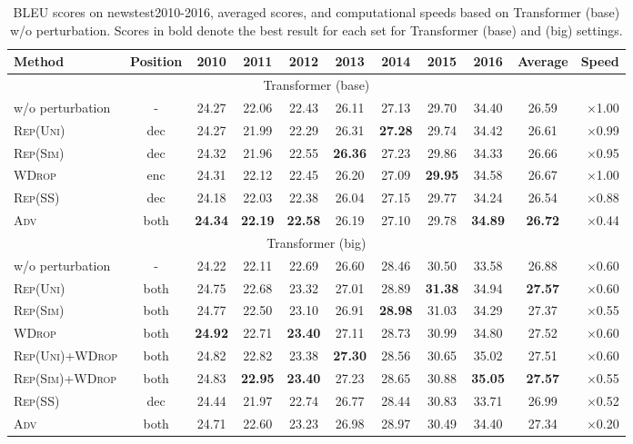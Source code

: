 \documentclass[11pt]{article}
\newcommand{\uniform}{\textsc{Rep(Uni)}}
\newcommand{\parass}{\textsc{Rep(SS)}}
\newcommand{\similarity}{\textsc{Rep(Sim)}}
\newcommand{\worddrop}{\textsc{WDrop}}
\newcommand{\adv}{\textsc{Adv}}
\begin{document}
\begin{table*}[!t]
  \centering{}
  \footnotesize
  \begin{tabular}{ l | c | c c c c c c c | c | r } \hline
  Method & Position & 2010 & 2011 & 2012 & 2013 & 2014 & 2015 & 2016 & Average & Speed \\ \hline \hline
  \multicolumn{11}{c}{Transformer (base)} \\ \hline \hline
  w/o perturbation & - & 24.27 & 22.06 & 22.43 & 26.11 & 27.13 & 29.70 & 34.40 & 26.59 & $\times$1.00 \\ \hline
  \uniform{} & dec & 24.27 & 21.99 & 22.29 & 26.31 & \textbf{27.28} & 29.74 & 34.42 & 26.61 & $\times$0.99 \\
  \similarity{} & dec & 24.32 & 21.96 & 22.55 & \textbf{26.36} & 27.23 & 29.86 & 34.33 & 26.66 & $\times$0.95 \\
  \worddrop{} & enc & 24.31 & 22.12 & 22.45 & 26.20 & 27.09 & \textbf{29.95} & 34.58 & 26.67 & $\times$1.00 \\
  \parass{} & dec & 24.18 & 22.03 & 22.38 & 26.04 & 27.15 & 29.77 & 34.24 & 26.54 & $\times$0.88 \\
  \adv{} & both & \textbf{24.34} & \textbf{22.19} & \textbf{22.58} & 26.19 & 27.10 & 29.78 & \textbf{34.89} & \textbf{26.72}& $\times$0.44 \\ \hline \hline
  \multicolumn{11}{c}{Transformer (big)} \\ \hline \hline 
  w/o perturbation & - & 24.22 & 22.11 & 22.69 & 26.60 & 28.46 & 30.50 & 33.58 & 26.88 & $\times$0.60 \\ \hline
  \uniform{} & both & 24.75 & 22.68 & 23.32 & 27.01 & 28.89 & \textbf{31.38} & 34.94 & \textbf{27.57} & $\times$0.60 \\
  \similarity{} & both & 24.77 & 22.50 & 23.10 & 26.91 & \textbf{28.98} & 31.03 & 34.29 & 27.37 & $\times$0.55 \\
  \worddrop{} & both & \textbf{24.92} & 22.71 & \textbf{23.40} & 27.11 & 28.73 & 30.99 & 34.80 & 27.52 & $\times$0.60 \\
  \uniform{}+\worddrop{} & both & 24.82 & 22.82 & 23.38 & \textbf{27.30} & 28.56 & 30.65 & 35.02 & 27.51 & $\times$0.60 \\
  \similarity{}+\worddrop{} & both & 24.83 & \textbf{22.95} & \textbf{23.40} & 27.23 & 28.65 & 30.88 & \textbf{35.05} & \textbf{27.57} & $\times$0.55  \\
  \parass{} & dec & 24.44 & 21.97 & 22.74 & 26.77 & 28.44 & 30.83 & 33.71 & 26.99& $\times$0.52 \\
  \adv{} & both & 24.71 & 22.60 & 23.23 & 26.98 & 28.97 & 30.49 & 34.40 & 27.34& $\times$0.20 \\ \hline
  \end{tabular}
  \caption{BLEU scores on newstest2010-2016, averaged scores, and computational speeds based on Transformer (base) w/o perturbation. Scores in bold denote the best result for each set for Transformer (base) and (big) settings.\label{tab:exp_mt_on_standard}}
\end{table*}
\end{document}
